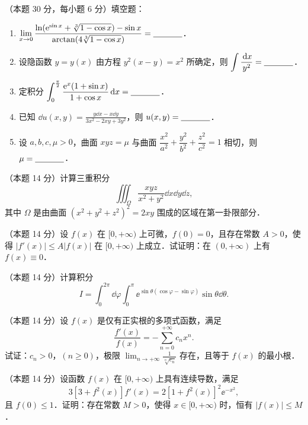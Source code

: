 
\begin{problems}
\item[一、]（本题 30 分，每小题 6 分）填空题：
\begin{enumerate}
  \item $\displaystyle \lim_{x\to 0}\frac{\ln(\mathrm{e}^{\sin x}+\sqrt[3]{1-\cos x})-\sin x}{\arctan(4\sqrt[3]{1-\cos x})}=\underline{\hspace{3.5em}}$．
  \item 设隐函数 $y=y(x)$ 由方程 $y^2(x-y)=x^2$ 所确定，则 $\displaystyle \int\frac{\,\mathrm{d} x}{y^2}=\underline{\hspace{3.5em}}$．
  \item 定积分 $\displaystyle \int_0^{\frac{\pi}{2}}\frac{\mathrm{e}^x(1+\sin x)}{1+\cos x}\,\mathrm{d} x=\underline{\hspace{3.5em}}$．
  \item 已知 $\dd u(x,y)=\frac{y\dd x-x\dd y}{3x^2-2xy+3y^2}$，则 $u(x,y)=\underline{\hspace{3.5em}}$．
  \item 设 $a,b,c,\mu>0$，曲面 $xyz=\mu$ 与曲面 $\dfrac{x^2}{a^2}+\dfrac{y^2}{b^2}+\dfrac{z^2}{c^2}=1$ 相切，则 $\mu=\underline{\hspace{3.5em}}$．
\end{enumerate}

\item[二、]（本题 14 分）计算三重积分
\[
  \iiint_{\Omega}\frac{xyz}{x^2+y^2}\dd x\dd y\dd z,
\]
其中 $\Omega$ 是由曲面 $(x^2+y^2+z^2)^2=2xy$ 围成的区域在第一卦限部分．

\item[三、]（本题 14 分）设 $f(x)$ 在 $[0,+\infty)$ 上可微，$f(0)=0$，且存在常数 $A>0$，使得 $|f'(x)|\le A|f(x)|$ 在 $[0,+\infty)$ 上成立．试证明：在 $(0,+\infty)$ 上有 $f(x)\equiv 0$．

\item[四、]（本题 14 分）计算积分
\[
  I=\int_0^{2\pi}\dd\varphi\int_0^{\pi}\ee^{\sin\theta(\cos\varphi-\sin\varphi)}\sin\theta\dd\theta.
\]

\item[五、]（本题 14 分）设 $f(x)$ 是仅有正实根的多项式函数，满足
\[
  \frac{f'(x)}{f(x)}=-\sum_{n=0}^{+\infty}c_nx^n.
\]
试证：$c_n>0$，$(n\ge 0)$，极限 $\displaystyle \lim_{n\to+\infty}\frac{1}{\sqrt[n]{c_n}}$ 存在，且等于 $f(x)$ 的最小根．

\item[六、]（本题 14 分）设函数 $f(x)$ 在 $[0,+\infty)$ 上具有连续导数，满足
\[
  3[3+f^2(x)]f'(x)=2[1+f^2(x)]^2\ee^{-x^2},
\]
且 $f(0)\le 1$．证明：存在常数 $M>0$，使得 $x\in[0,+\infty)$ 时，恒有 $|f(x)|\le M$．
\end{problems}
